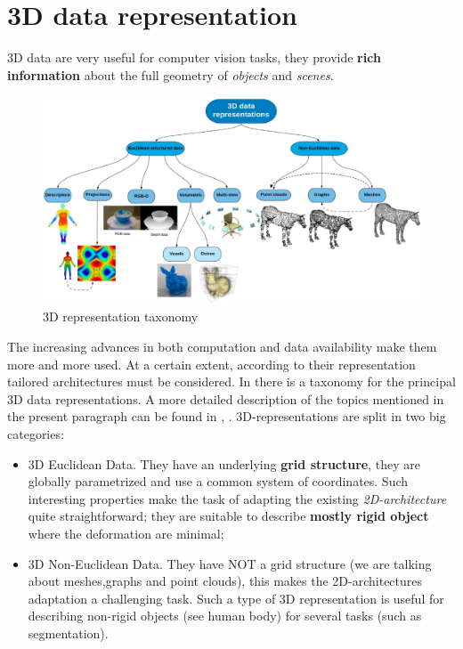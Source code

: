 \section{3D data representation}
3D data are very useful for computer vision tasks, they provide \textbf{rich information} about the full geometry of \textit{objects} and \textit{scenes}.
\begin{figure}[h]
    \centering
    \includegraphics[scale=0.5]{img/3Drep.png}
    \caption{3D representation taxonomy}
    \label{fig:3D_taxonomy}
\end{figure}

The increasing advances in both computation and data availability make them more and more used. At a certain extent, according to their representation tailored architectures must be considered. In  there is a taxonomy for the principal 3D data representations. A more detailed description of the topics mentioned in the present paragraph can be found in \citeauthor{ahmed2018survey}, \cite{ahmed2018survey}. 3D-representations are split in two big categories:
\begin{itemize}
    \item \textsf{3D Euclidean Data}. They have an underlying \textbf{grid structure}, they are globally parametrized and use a common system of coordinates. Such interesting properties make the task of adapting the existing \textit{2D-architecture} quite straightforward; they are suitable to describe \textbf{mostly rigid object} where the deformation are minimal;
    \item \textsf{3D Non-Euclidean Data}. They have NOT a grid structure (we are talking about meshes,graphs and point clouds), this makes the 2D-architectures adaptation a challenging task. Such a type of 3D representation is useful for describing non-rigid objects (see human body) for several tasks (such as segmentation).
\end{itemize}

